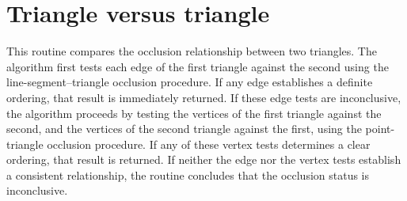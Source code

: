 \section{Triangle versus triangle}

This routine compares the occlusion relationship between two triangles. 
The algorithm first tests each edge of the first triangle against the 
second using the line-segment--triangle occlusion procedure. If any edge 
establishes a definite ordering, that result is 
immediately returned. If these edge tests are inconclusive, the 
algorithm proceeds by testing the vertices of the first triangle against 
the second, and the vertices of the second triangle against the first, 
using the point-triangle occlusion procedure. If any of these vertex 
tests determines a clear ordering, that result is returned. If neither 
the edge nor the vertex tests establish a consistent relationship, the 
routine concludes that the occlusion status is inconclusive.